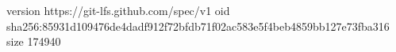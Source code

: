 version https://git-lfs.github.com/spec/v1
oid sha256:85931d109476de4dadf912f72bfdb71f02ac583e5f4beb4859bb127e73fba316
size 174940
